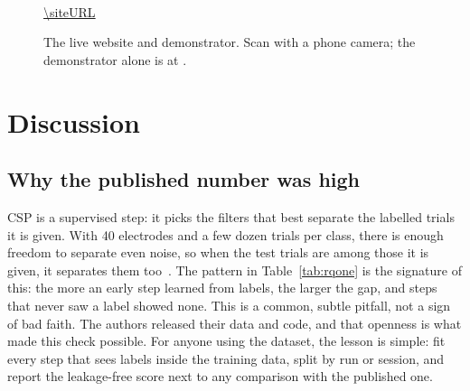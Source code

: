 \begin{figure}[tbp]
  \centering
  \qrcode[height=2.6cm]{\siteURL}\\[6pt]
  {\small\url{\siteURL}}
  \caption[The live website and demonstrator]{The live website and demonstrator. Scan with a phone camera; the demonstrator
  alone is at .}
  \label{fig:qr}
\end{figure}

\section{Discussion}\label{sec:discussion}

\subsection{Why the published number was high}
CSP is a supervised step: it picks the filters that best separate the labelled trials it
is given. With 40 electrodes and a few dozen trials per class, there is enough freedom to
separate even noise, so when the test trials are among those it is given, it separates
them too~\cite{kapoor2023,varoquaux2017}. The pattern in Table~\ref{tab:rqone} is the
signature of this: the more an early step learned from labels, the larger the gap, and
steps that never saw a label showed none. This is a common, subtle pitfall, not a sign of
bad faith. The authors released their data and code, and that openness is what made this
check possible. For anyone using the dataset, the lesson is simple: fit
every step that sees labels inside the training data, split by run or session, and report
the leakage-free score next to any comparison with the published one.

